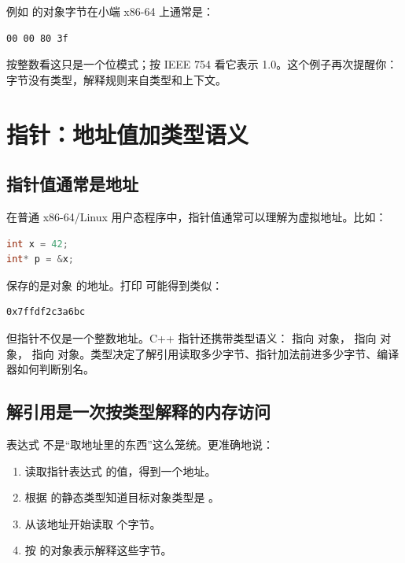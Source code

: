 例如  的对象字节在小端 x86-64 上通常是：

\begin{center}
\begin{minipage}{0.5\linewidth}
\begin{verbatim}
00 00 80 3f
\end{verbatim}
\end{minipage}
\end{center}

按整数看这只是一个位模式；按 IEEE 754  看它表示 1.0。这个例子再次提醒你：字节没有类型，解释规则来自类型和上下文。

\section{指针：地址值加类型语义}

\subsection{指针值通常是地址}

在普通 x86-64/Linux 用户态程序中，指针值通常可以理解为虚拟地址。比如：

\begin{lstlisting}[language=C++]
int x = 42;
int* p = &x;
\end{lstlisting}

 保存的是对象  的地址。打印  可能得到类似：

\begin{center}
\begin{minipage}{0.62\linewidth}
\begin{verbatim}
0x7ffdf2c3a6bc
\end{verbatim}
\end{minipage}
\end{center}

但指针不仅是一个整数地址。C++ 指针还携带类型语义： 指向  对象， 指向  对象， 指向  对象。类型决定了解引用读取多少字节、指针加法前进多少字节、编译器如何判断别名。

\subsection{解引用是一次按类型解释的内存访问}

表达式  不是“取地址里的东西”这么笼统。更准确地说：

\begin{enumerate}
  \item 读取指针表达式  的值，得到一个地址。
  \item 根据  的静态类型知道目标对象类型是 。
  \item 从该地址开始读取  个字节。
  \item 按  的对象表示解释这些字节。
\end{enumerate}

